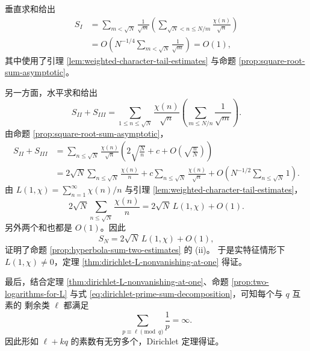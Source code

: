 垂直求和给出
\[
\begin{aligned}
S_I
&=\sum_{m<\sqrt N}\frac1{\sqrt m}
\left(
\sum_{\sqrt N<n\leq N/m}\frac{\chi(n)}{\sqrt n}
\right)\\
&=O\left(N^{-1/4}\sum_{m<\sqrt N}\frac1{\sqrt m}\right)
=O(1),
\end{aligned}
\]
其中使用了引理 \ref{lem:weighted-character-tail-estimates} 与命题
\ref{prop:square-root-sum-asymptotic}。

另一方面，水平求和给出
\[
S_{II}+S_{III}
=\sum_{1\leq n\leq\sqrt N}\frac{\chi(n)}{\sqrt n}
\left(
\sum_{m\leq N/n}\frac1{\sqrt m}
\right).
\]
由命题 \ref{prop:square-root-sum-asymptotic}，
\[
\begin{aligned}
S_{II}+S_{III}
&=\sum_{n\leq\sqrt N}\frac{\chi(n)}{\sqrt n}
\left(2\sqrt{\frac Nn}+c
+O\left(\sqrt{\frac nN}\right)\right)\\
&=2\sqrt N\sum_{n\leq\sqrt N}\frac{\chi(n)}n
+c\sum_{n\leq\sqrt N}\frac{\chi(n)}{\sqrt n}
+O\left(N^{-1/2}\sum_{n\leq\sqrt N}1\right).
\end{aligned}
\]
由 $L(1,\chi)=\sum\limits_{n=1}^{\infty}\chi(n)/n$ 与引理
\ref{lem:weighted-character-tail-estimates}，
\[
2\sqrt N\sum_{n\leq\sqrt N}\frac{\chi(n)}n
=2\sqrt N\,L(1,\chi)+O(1).
\]
另外两个和也都是 $O(1)$。因此
\[
S_N=2\sqrt N\,L(1,\chi)+O(1),
\]
证明了命题 \ref{prop:hyperbola-sum-two-estimates} 的 \textup{(ii)}。
于是实特征情形下 $L(1,\chi)\neq0$，定理
\ref{thm:dirichlet-L-nonvanishing-at-one} 得证。

最后，结合定理 \ref{thm:dirichlet-L-nonvanishing-at-one}、命题
\ref{prop:two-logarithms-for-L} 与式
\eqref{eq:dirichlet-prime-sum-decomposition}，可知每个与 $q$ 互素的
剩余类 $\ell$ 都满足
\[
\sum_{p\equiv\ell\pmod q}\frac1p=\infty.
\]
因此形如 $\ell+kq$ 的素数有无穷多个，Dirichlet 定理得证。
